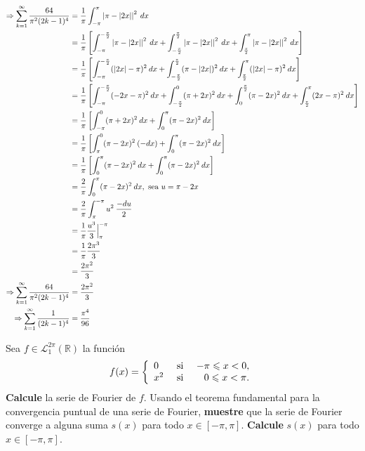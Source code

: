 \documentclass[12pt]{report}
\theoremstyle{largebreak}
\renewcommand{\leq}{\ensuremath{\leqslant}}
\newcommand\abs[1]{\ensuremath{\left|#1\right|}}
\begin{document}
\begin{sol}
\begin{equation*}
\begin{split}
                \Rightarrow \sum_{ k=1}^\infty\frac{64}{\pi^2(2k-1)^4}&=\frac{1}{\pi}\int_{-\pi}^\pi\abs{\pi-\abs{2x}}^2\:dx\\
                &=\frac{1}{\pi}\left[\int_{-\pi}^{-\frac{\pi}{2}}\abs{\pi-\abs{2x}}^2\:dx +\int_{-\frac{\pi}{2}}^{\frac{\pi}{2}}\abs{\pi-\abs{2x}}^2\:dx+\int_{\frac{\pi}{2}}^{\pi}\abs{\pi-\abs{2x}}^2\:dx \right]\\
                &=\frac{1}{\pi}\left[\int_{-\pi}^{-\frac{\pi}{2}}(\abs{2x}-\pi)^2\:dx +\int_{-\frac{\pi}{2}}^{\frac{\pi}{2}}(\pi-\abs{2x})^2\:dx+\int_{\frac{\pi}{2}}^{\pi}(\abs{2x}-\pi)^2\:dx \right]\\
                &=\frac{1}{\pi}\left[\int_{-\pi}^{-\frac{\pi}{2}}(-2x-\pi)^2\:dx+\int_{-\frac{\pi}{2}}^{0}(\pi+2x)^2\:dx+\int_{0}^{\frac{\pi}{2}}(\pi-2x)^2\:dx+\int_{\frac{\pi}{2}}^{\pi}(2x-\pi)^2\:dx \right]\\
                &=\frac{1}{\pi}\left[\int_{-\pi}^{0}(\pi+2x)^2\:dx+\int_{0}^{\pi}(\pi-2x)^2\:dx \right]\\
                &=\frac{1}{\pi}\left[\int_{\pi}^{0}(\pi-2x)^2\:(-dx)+\int_{0}^{\pi}(\pi-2x)^2\:dx \right]\\
                &=\frac{1}{\pi}\left[\int_{0}^{\pi}(\pi-2x)^2\:dx+\int_{0}^{\pi}(\pi-2x)^2\:dx \right]\\
                &=\frac{2}{\pi}\int_{0}^{\pi}(\pi-2x)^2\:dx,\textup{ sea }u=\pi-2x \\
                &=\frac{2}{\pi}\int_{\pi}^{-\pi}u^2\:\frac{-du}{2}\\
                &=\frac{1}{\pi}\frac{u^3}{3}\Big|_{\pi}^{-\pi}\\
                &=\frac{1}{\pi}\frac{2\pi^3}{3}\\
                &=\frac{2\pi^2}{3}\\
                \Rightarrow \sum_{ k=1}^\infty\frac{64}{\pi^2(2k-1)^4}&=\frac{2\pi^2}{3}\\
                \Rightarrow \sum_{ k=1}^\infty\frac{1}{(2k-1)^4}&=\frac{\pi^4}{96}\\
            \end{split}
        \end{equation*}
    \end{sol}

    \begin{excer}
        Sea $f\in\mathcal{L}_1^{2\pi}(\mathbb{R})$ la función
        \begin{equation*}
            f(x)=\left\{ 
                \begin{array}{lcr}
                    0 & \textup{ si } & -\pi\leq x<0,\\
                    x^2 & \textup{ si } & 0\leq x<\pi.\\
                \end{array}
            \right.
        \end{equation*}
        \textbf{Calcule} la serie de Fourier de $f$. Usando el teorema fundamental para la convergencia puntual de una serie de Fourier, \textbf{muestre} que la serie de Fourier converge a alguna suma $s(x)$ para todo $x\in[-\pi,\pi]$. \textbf{Calcule} $s(x)$ para todo $x\in[-\pi,\pi]$.
    \end{excer}
\end{document}
